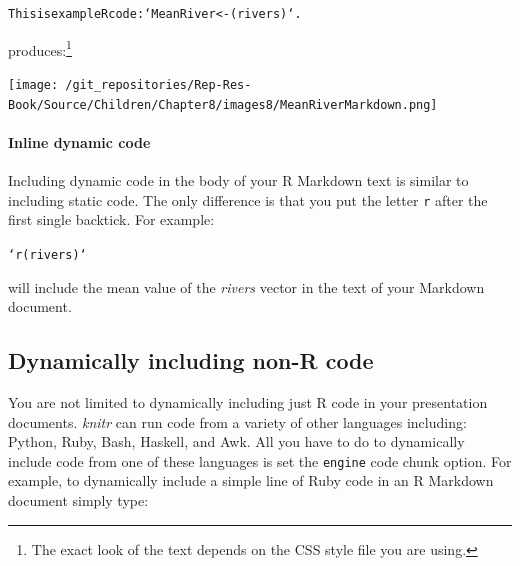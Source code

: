 \begin{knitrout}
\color{fgcolor}\begin{kframe}
\begin{alltt}
This is example R code: `MeanRiver <- (rivers)`.
\end{alltt}
\end{kframe}
\end{knitrout}


\noindent produces:\footnote{The exact look of the text depends on the CSS style file you are using.}

\texttt{[image: /git\_repositories/Rep-Res-Book/Source/Children/Chapter8/images8/MeanRiverMarkdown.png]}

\paragraph{Inline dynamic code}

Including dynamic code in the body of your R Markdown text is similar to including static code. The only difference is that you put the letter \texttt{r} after the first single backtick. For example:

\begin{knitrout}
\color{fgcolor}\begin{kframe}
\begin{alltt}
`r (rivers)`
\end{alltt}
\end{kframe}
\end{knitrout}


\noindent will include the mean value of the {\emph{rivers}} vector in the text of your Markdown document.

\subsection{Dynamically including non-R code}

You are not limited to dynamically including just R code in your presentation documents. {\emph{knitr}} can run code from a variety of other languages including: Python, Ruby, Bash, Haskell, and Awk. All you have to do to dynamically include code from one of these languages is set the \texttt{engine} code chunk option. For example, to dynamically include a simple line of Ruby code in an R Markdown document simply type:

